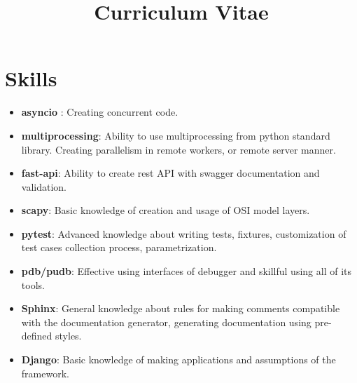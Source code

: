 \documentclass[11pt,a4paper,sans]{moderncv} %
\title{Curriculum Vitae}
\begin{document}
\makecvtitle %



\section{Skills}

 {
    \begin{itemize}
    \item \textbf{asyncio} : Creating concurrent code.
    \item \textbf{multiprocessing}: Ability to use multiprocessing from python standard library. Creating parallelism in remote workers, or remote server manner.
    \item \textbf{fast-api}: Ability to create rest API with swagger documentation and validation.
    \item \textbf{scapy}: Basic knowledge of creation and usage of OSI model layers.
    \item \textbf{pytest}: Advanced knowledge about writing tests, fixtures, customization of test cases collection process, parametrization.
    \item \textbf{pdb/pudb}: Effective using interfaces of debugger and skillful using all of its tools.
    \item \textbf{Sphinx}: General knowledge about rules for making comments compatible with the documentation generator, generating documentation using pre-defined styles.
    \item \textbf{Django}: Basic knowledge of making applications and assumptions of the framework.
    \end{itemize}
}
\end{document}
